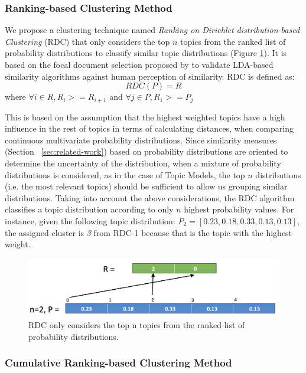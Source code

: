 \subsubsection{Ranking-based Clustering Method}

We propose a clustering technique named \textit{Ranking on Dirichlet distribution-based Clustering} (RDC) that only considers the top $n$ topics from the ranked list of probability distributions to classify similar topic distributions (Figure \ref{fig:rdc-cluster}). It is based on the focal document selection proposed by \citep{Towne2016} to validate LDA-based similarity algorithms against human perception of similarity. RDC is defined as:
\begin{equation}
RDC(P)=R
\end{equation}
where  $\forall i \in R, R_i>=R_{i+1}$ and $\forall j \in P, R_1>=P_j$

This is based on the assumption that the highest weighted topics have a high influence in the rest of topics in terms of calculating distances, when comparing continuous multivariate probability distributions. Since similarity measures (Section ~\ref{sec:related-work}) based on probability distributions are oriented to determine the uncertainty of the distribution, when a mixture of probability distributions is considered, as in the case of Topic Models, the top $n$ distributions (i.e. the most relevant topics) should be sufficient to allow us grouping similar distributions. Taking into account the above considerations, the RDC algorithm classifies a topic distribution according to only $n$ highest probability values. For instance, given the following topic distribution: $P_2=[0.23, 0.18, 0.33, 0.13, 0.13]$, the assigned cluster is \textit{3} from RDC-1 because that is the topic with the highest weight.

\begin{figure}[!htbp]
  \centering
  \includegraphics[scale=0.33]{rdc-cluster.png}
  \caption{RDC only considers the top n topics from the ranked list of probability distributions.}
  \label{fig:rdc-cluster}
\end{figure}


\subsubsection{Cumulative Ranking-based Clustering Method}

